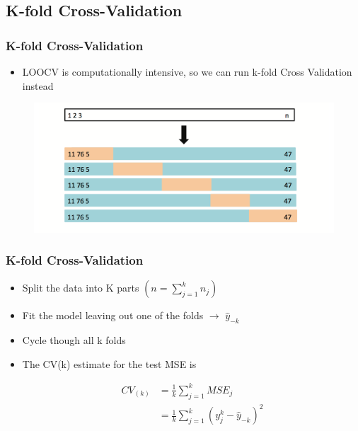 \documentclass[
  shownotes,
  xcolor={svgnames},
  hyperref={colorlinks,citecolor=DarkBlue,linkcolor=DarkRed,urlcolor=DarkBlue}
  , aspectratio=169]{beamer}
\begin{document}
\subsection{K-fold Cross-Validation}
\begin{frame}[fragile]
\frametitle{K-fold Cross-Validation}
\begin{itemize}
\item LOOCV is computationally intensive, so we can run k-fold Cross Validation instead
\end{itemize}


 \begin{figure}[H] \centering
            \captionsetup{justification=centering}
              \includegraphics[scale=0.5]{figures/fig55.png}
       \end{figure}



\end{frame}
\begin{frame}[fragile]
\frametitle{K-fold Cross-Validation}

\begin{itemize}
  \item Split the data into K parts $(n=\sum_{j=1}^k n_j)$
  \medskip
  \item Fit the model leaving out one of the folds $\rightarrow$ $\hat{y}_{-k}$
  \medskip
  \item Cycle though all k folds
  \medskip
  \item The CV(k) estimate for the test MSE is


\begin{align}
CV_{(k)} &= \frac{1}{k}\sum_{j=1}^k MSE_j \\
         &= \frac{1}{k}\sum_{j=1}^k (y_j^k-\hat{y}_{-k})^{2}
\end{align}
\end{itemize}

\end{frame}
\end{document}

